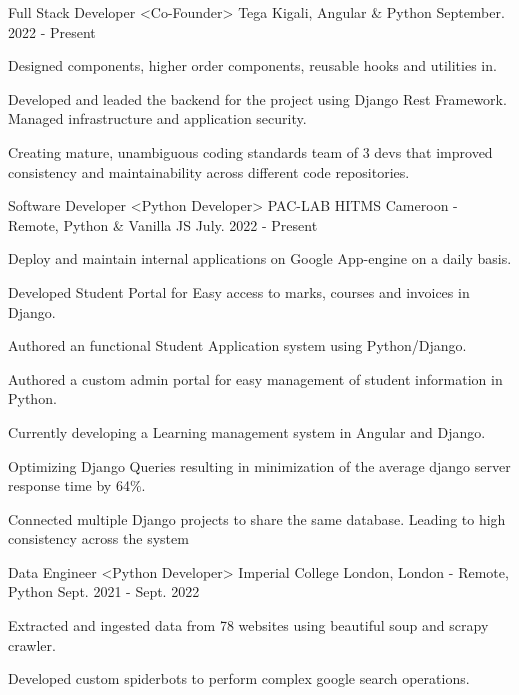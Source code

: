 \begin{cventries}

  \cventry
    {Full Stack Developer <Co-Founder>}
    {Tega}
    {Kigali, Angular \& Python}
    {September. 2022 - Present}
    {
      \begin{cvitems}
        \item {Designed components, higher order components, reusable hooks and utilities in.}
        \item {Developed and leaded the backend for the project using Django Rest Framework. Managed infrastructure and application security.}
         \item {Creating mature, unambiguous coding standards team of 3 devs that improved consistency and maintainability across different code repositories.}
      \end{cvitems}
    }
  \cventry
    {Software Developer <Python Developer>}
    {PAC-LAB HITMS}
    {Cameroon - Remote, Python \& Vanilla JS}
    {July. 2022 - Present}
    {
      \begin{cvitems}
        \item {Deploy and maintain internal applications on Google App-engine on a daily basis.}
        \item {Developed Student Portal for Easy access to marks, courses and invoices in Django.}
        \item {Authored an functional Student Application system using Python/Django.}
        \item {Authored a custom admin portal for easy management of student information in Python.}
        \item {Currently developing a Learning management system in Angular and Django.}
        \item {Optimizing Django Queries resulting in minimization of the average django server response time by 64\%. }
        \item {Connected multiple Django projects to share the same database. Leading to high consistency across the system}
      \end{cvitems}
    }
  \cventry
    {Data Engineer <Python Developer>}
    {Imperial College London,}
    {London - Remote, Python}
    {Sept. 2021 - Sept. 2022}
    {
      \begin{cvitems}
        \item {Extracted and ingested data from 78 websites using beautiful soup and scrapy crawler.}
        \item {Developed custom spiderbots to perform complex google search operations.}

\end{cvitems}}
\end{cventries}
